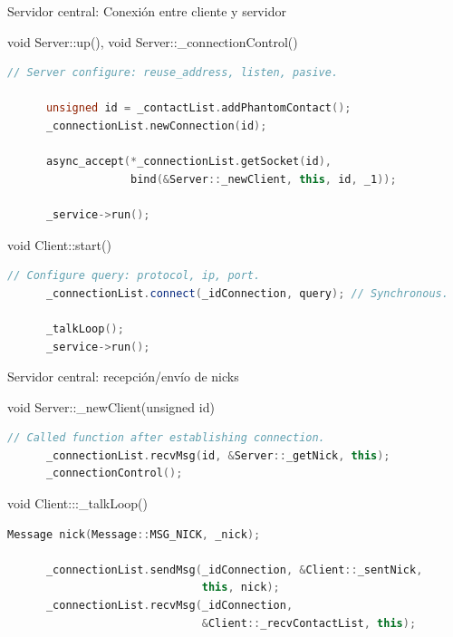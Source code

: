 \documentclass[spanish,xcolor=dvipsnames,svgnames]{beamer}
\begin{document}


\begin{frame}[fragile]{Servidor central: Conexión entre cliente y servidor}

  \begin{block}{void Server::up(), void Server::\_connectionControl()}
    \begin{lstlisting}[language=C++]
      // Server configure: reuse_address, listen, pasive.

      unsigned id = _contactList.addPhantomContact();
      _connectionList.newConnection(id);

      async_accept(*_connectionList.getSocket(id),
                   bind(&Server::_newClient, this, id, _1));

      _service->run();
    \end{lstlisting}
  \end{block}

  \begin{block}{void Client::start()}
    \begin{lstlisting}[language=C++]
      // Configure query: protocol, ip, port.
      _connectionList.connect(_idConnection, query); // Synchronous.

      _talkLoop();
      _service->run();
    \end{lstlisting}
  \end{block}

\end{frame}

\begin{frame}[fragile]{Servidor central: recepción/envío de nicks}
  \begin{block}{void Server::\_newClient(unsigned id)}
    \begin{lstlisting}[language=C++]
      // Called function after establishing connection.
      _connectionList.recvMsg(id, &Server::_getNick, this);
      _connectionControl();
    \end{lstlisting}
  \end{block}

  \pause

  \begin{block}{void Client:::\_talkLoop()}
    \begin{lstlisting}[language=C++]
      Message nick(Message::MSG_NICK, _nick);

      _connectionList.sendMsg(_idConnection, &Client::_sentNick,
                              this, nick);
      _connectionList.recvMsg(_idConnection,
                              &Client::_recvContactList, this);
    \end{lstlisting}
  \end{block}
\end{frame}
\end{document}
